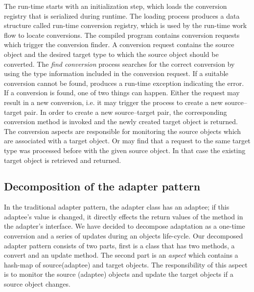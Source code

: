 The \zamk run-time starts with an initialization step, which loads the conversion registry that is serialized during runtime. 
The loading process produces a data structure called run-time conversion registry, which is used by the run-time work flow to locate conversions.
The compiled program contains \zamk conversion requests which trigger the conversion finder. 
A conversion request contains the source object and the desired target type to which the source object should be converted. 
The \emph{find conversion} process searches for the correct conversion by using the type information included in the conversion request. 
If a suitable conversion cannot be found, \zamk produces a run-time exception indicating the error. 
If a conversion is found, one of two things can happen. Either the request may result in a new conversion, i.e. it may trigger the process to create a new source--target pair. In order to create a new source--target pair, the corresponding conversion method is invoked and the newly created target object is returned. 
The conversion aspects are responsible for monitoring the source objects which are associated with a target object. Or \zamk may find that a request to the same target type was processed before with the given source object. In that case the existing target object is retrieved and returned. 







\subsection{Decomposition of the adapter pattern}
In the traditional adapter pattern, the adapter class has an adaptee; if this adaptee's value is changed, it directly effects the return values of the method in the adapter's interface.
We have decided to decompose adaptation as a one-time conversion and a series of updates during an objects life-cycle. 
Our decomposed adapter pattern consists of two parts, first is a class that has two methods, a convert and an update method. 
The second part is an \emph{aspect} which contains a hash-map of source(adaptee) and target objects. 
The responsibility of this aspect is to monitor the source (adaptee) objects and update the target objects if a source object changes.

